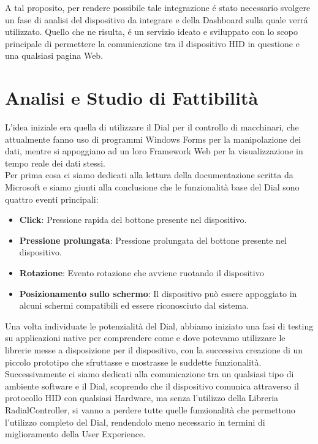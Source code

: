 A tal proposito, per rendere possibile tale integrazione é stato necessario svolgere un fase di analisi del dispositivo da integrare e della Dashboard sulla quale verrá utilizzato. Quello che ne risulta, é un servizio ideato e sviluppato con lo scopo principale di permettere la comunicazione tra il dispositivo HID in questione e una qualsiasi pagina Web.

\newpage
\section{Analisi e Studio di Fattibilità}

L'idea iniziale era quella di utilizzare il Dial per il controllo di macchinari, che attualmente fanno uso di programmi Windows Forms per la manipolazione dei dati, mentre si appoggiano ad un loro Framework Web per la visualizzazione in tempo reale dei dati stessi.\\

Per prima cosa ci siamo dedicati alla lettura della documentazione scritta da Microsoft \cite{dialdoc} e siamo giunti alla conclusione che le funzionalità base del Dial sono quattro eventi principali:

\begin{itemize}
\item \textbf{Click}: Pressione rapida del bottone presente nel dispositivo.
\item \textbf{Pressione prolungata}: Pressione prolungata del bottone presente nel dispositivo.
\item \textbf{Rotazione}: Evento rotazione che avviene ruotando il dispositivo
\item \textbf{Posizionamento sullo schermo}: Il dispositivo può essere appoggiato in alcuni schermi compatibili ed essere riconosciuto dal sistema.
\end{itemize}

Una volta individuate le potenzialità del Dial, abbiamo iniziato una fasi di testing su applicazioni native\cite{uwpex} per comprendere come e dove potevamo utilizzare le librerie messe a disposizione per il dispositivo, con la successiva creazione di un piccolo prototipo che sfruttasse e mostrasse le suddette funzionalità.\\

Successivamente ci siamo dedicati alla comunicazione tra un qualsiasi tipo di ambiente software e il Dial, scoprendo che il dispositivo comunica attraverso il protocollo HID con qualsiasi Hardware, ma senza l'utilizzo della Libreria RadialController, si vanno a perdere tutte quelle funzionalità che permettono l'utilizzo completo del Dial, rendendolo meno necessario in termini di miglioramento della User Experience.
 
